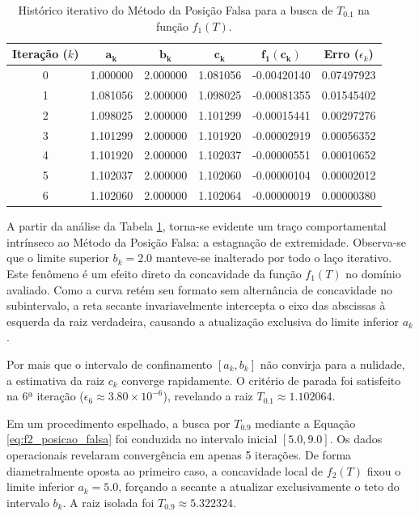 \begin{table}[htpb]
\centering
\caption{Histórico iterativo do Método da Posição Falsa para a busca de $T_{0.1}$ na função $f_1(T)$.}
\label{tab:posicao_falsa_f1}
\small
\begin{tabular}{@{}cccccc@{}}
\toprule
\textbf{Iteração ($k$)} & $\mathbf{a_k}$ & $\mathbf{b_k}$ & $\mathbf{c_k}$ & $\mathbf{f_1(c_k)}$ & \textbf{Erro} ($\epsilon_k$) \\ \midrule
0 & 1.000000 & 2.000000 & 1.081056 & -0.00420140 & 0.07497923 \\
1 & 1.081056 & 2.000000 & 1.098025 & -0.00081355 & 0.01545402 \\
2 & 1.098025 & 2.000000 & 1.101299 & -0.00015441 & 0.00297276 \\
3 & 1.101299 & 2.000000 & 1.101920 & -0.00002919 & 0.00056352 \\
4 & 1.101920 & 2.000000 & 1.102037 & -0.00000551 & 0.00010652 \\
5 & 1.102037 & 2.000000 & 1.102060 & -0.00000104 & 0.00002012 \\
6 & 1.102060 & 2.000000 & 1.102064 & -0.00000019 & 0.00000380 \\ \bottomrule
\end{tabular}
\end{table}

A partir da análise da Tabela \ref{tab:posicao_falsa_f1}, torna-se evidente um traço comportamental intrínseco ao Método da Posição Falsa: a estagnação de extremidade. Observa-se que o limite superior $b_k = 2.0$ manteve-se inalterado por todo o laço iterativo. Este fenômeno é um efeito direto da concavidade da função $f_1(T)$ no domínio avaliado. Como a curva retém seu formato sem alternância de concavidade no subintervalo, a reta secante invariavelmente intercepta o eixo das abscissas à esquerda da raiz verdadeira, causando a atualização exclusiva do limite inferior $a_k$.

Por mais que o intervalo de confinamento $[a_k, b_k]$ não convirja para a nulidade, a estimativa da raiz $c_k$ converge rapidamente. O critério de parada foi satisfeito na 6ª iteração ($\epsilon_6 \approx 3.80 \times 10^{-6}$), revelando a raiz $T_{0.1} \approx 1.102064$. 

Em um procedimento espelhado, a busca por $T_{0.9}$ mediante a Equação \ref{eq:f2_posicao_falsa} foi conduzida no intervalo inicial $[5.0, 9.0]$. Os dados operacionais revelaram convergência em apenas 5 iterações. De forma diametralmente oposta ao primeiro caso, a concavidade local de $f_2(T)$ fixou o limite inferior $a_k = 5.0$, forçando a secante a atualizar exclusivamente o teto do intervalo $b_k$. A raiz isolada foi $T_{0.9} \approx 5.322324$.

